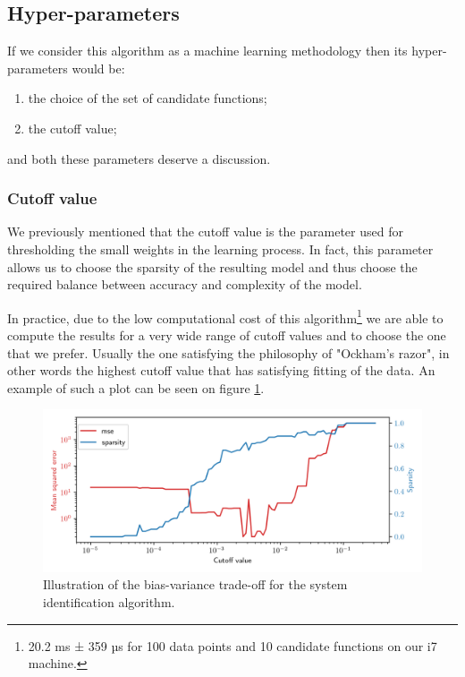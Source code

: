 \documentclass[12pt, letterpaper]{article}
\begin{document}
\subsection{Hyper-parameters}

If we consider this algorithm as a machine learning methodology then its hyper-parameters would be:
\begin{enumerate} 
    \item the choice of the set of candidate functions;
    \item the cutoff value; 
\end{enumerate}
and both these parameters deserve a discussion.

\subsubsection{Cutoff value}

We previously mentioned that the cutoff value is the parameter used for thresholding the small weights in the learning process. 
In fact, this parameter allows us to choose the sparsity of the resulting model and thus choose the required balance between accuracy and complexity of the model.

In practice, due to the low computational cost of this algorithm\footnote{20.2 ms ± 359 µs for 100 data points and 10 candidate functions on our i7 machine.} we are able to compute the results for a very wide range of cutoff values and to choose the one that we prefer. 
Usually the one satisfying the philosophy of "Ockham's razor", in other words the highest cutoff value that has satisfying fitting of the data. 
An example of such a plot can be seen on figure \ref{fig:tradeoff}. 


\begin{figure}[h]
\centering
\includegraphics[scale=0.8]{tradeoff.png}
\caption{Illustration of the bias-variance trade-off for the system identification algorithm.}
\label{fig:tradeoff}
\end{figure}
\end{document}
